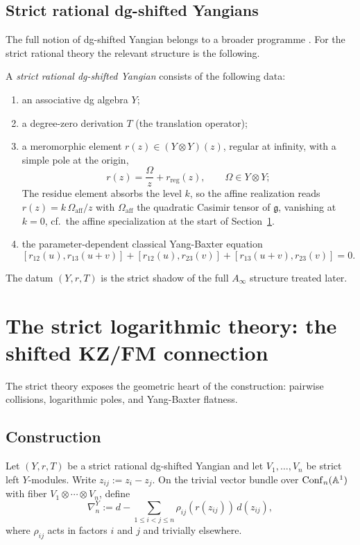 \subsection{Strict rational dg-shifted Yangians}
The full notion of dg-shifted Yangian belongs to a broader programme \cite{DNP25}. For the strict rational theory the relevant structure is the following.

\begin{definition}\label{def:strict-yangian}
A \emph{strict rational dg-shifted Yangian} consists of the following data:
\begin{enumerate}[label=\textup{(\alph*)}]
 \item an associative dg algebra $Y$;
 \item a degree-zero derivation $T$ (the translation operator);
 \item a meromorphic element $r(z)\in (Y\otimes Y)(z)$, regular at infinity, with a simple pole at the origin,
 \[
 r(z)=\frac{\Omega}{z}+r_{\mathrm{reg}}(z),\qquad \Omega\in Y\otimes Y;
 \]
 The residue element absorbs
 the level $k$, so the affine realization reads
 $r(z)=k\,\Omega_{\mathrm{aff}}/z$ with $\Omega_{\mathrm{aff}}$ the
 quadratic Casimir tensor of $\mathfrak g$, vanishing at $k=0$, cf.\
 the affine specialization at the start of Section~\ref{sec:strict}.
 \item the parameter-dependent classical Yang-Baxter equation
 \[
 [r_{12}(u),r_{13}(u+v)] + [r_{12}(u),r_{23}(v)] + [r_{13}(u+v),r_{23}(v)] = 0.
 \]
\end{enumerate}
\end{definition}

The datum $(Y,r,T)$ is the strict shadow of the full $A_\infty$ structure treated later.

\section{The strict logarithmic theory: the shifted KZ/FM connection}\label{sec:strict}

The strict theory exposes the geometric heart of the construction: pairwise collisions, logarithmic poles, and Yang-Baxter flatness.

\subsection{Construction}
Let $(Y,r,T)$ be a strict rational dg-shifted Yangian and let $V_1,\dots,V_n$ be strict left $Y$-modules. Write $z_{ij}:=z_i-z_j$. On the trivial vector bundle over $\mathrm{Conf}_n(\mathbb A^1)$ with fiber $V_1\otimes\cdots\otimes V_n$, define
\[
 \nabla_n^Y
 :=
 d-\sum_{1\le i<j\le n}\rho_{ij}(r(z_{ij}))\,d(z_{ij}),
\]
where $\rho_{ij}$ acts in factors $i$ and $j$ and trivially elsewhere.

